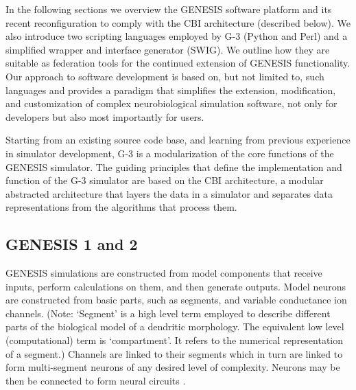 \documentclass[10pt]{article}
\begin{document}
In the following sections we overview the GENESIS software platform
and its recent reconfiguration to comply with the CBI architecture
(described below). We also introduce two scripting languages employed
by G-3 (Python and Perl) and a simplified wrapper and interface
generator (SWIG). We outline how they are suitable as federation tools
for the continued extension of GENESIS functionality. Our approach to
software development is based on, but not limited to, such languages
and provides a paradigm that simplifies the extension, modification,
and customization of complex neurobiological simulation software, not
only for developers but also most importantly for users.

Starting from an existing source code base, and learning from
previous experience in simulator development, G-3 is a modularization of the core functions of the GENESIS
simulator.  The guiding principles that define the implementation and
function of the G-3 simulator are based on the CBI
architecture, a modular abstracted architecture
that layers the data in a simulator and separates data
representations from the algorithms that process them.

\subsection*{GENESIS 1 and 2}
\label{sec:genesis}


GENESIS simulations are constructed from model components that receive
inputs, perform calculations on them, and then generate outputs. Model
neurons are constructed from basic parts, such as segments, and
variable conductance ion channels. (Note: `Segment' is a high level term employed to describe different parts of the biological model of a dendritic morphology. The equivalent low level (computational) term is `compartment'. It refers to the numerical representation of a segment.) Channels are linked to their
segments which in turn are linked to form
multi-segment neurons of any desired level of complexity.
Neurons may be then be connected to form neural circuits \cite{bower98:_book_genes}. 
\end{document}
